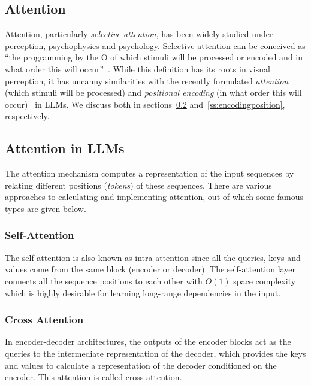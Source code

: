 \subsection{Attention}
\label{ss:attention}
Attention, particularly \textit{selective attention}, has been widely studied under perception, psychophysics and psychology. Selective attention can be conceived as \enquote{the programming by the O of which stimuli will be processed or encoded and in what order this will occur}~\cite{selectiveattention}. While this definition has its roots in visual perception, it has uncanny similarities with the recently formulated \textit{attention}~\cite{attention, Transformers} (which stimuli will be processed) and \textit{positional encoding} (in what order this will occur)~\cite{Transformers} in LLMs. We discuss both in sections~\ref{ss:llmattention} and~\ref{ss:encodingposition}, respectively. 

\subsection{Attention in LLMs}
\label{ss:llmattention}
The attention mechanism computes a representation of the input sequences by relating different positions (\textit{tokens}) of these sequences. There are various approaches to calculating and implementing attention, out of which some famous types are given below.

\subsubsection{Self-Attention~\cite{Transformers}}
\label{ss:selfattention}
The self-attention is also known as intra-attention since all the queries, keys and values come from the same block (encoder or decoder). The self-attention layer connects all the sequence positions to each other with $O(1)$ space complexity which is highly desirable for learning long-range dependencies in the input. 

\subsubsection{Cross Attention}
\label{ss:crossattention}
In encoder-decoder architectures, the outputs of the encoder blocks act as the queries to the intermediate representation of the decoder, which provides the keys and values to calculate a representation of the decoder conditioned on the encoder. This attention is called cross-attention.

